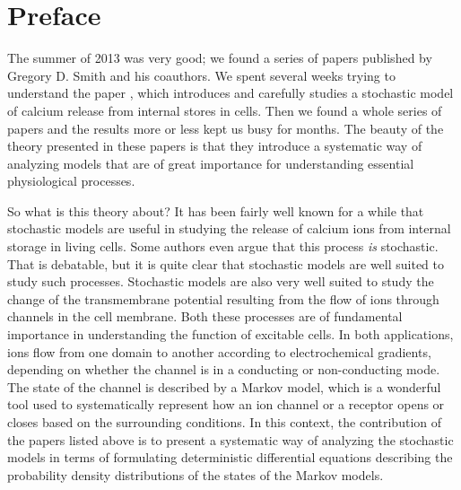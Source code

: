 

\chapter*{Preface}

The summer of 2013 was very good; we found a series of papers published by Gregory D. Smith and his coauthors. We spent several weeks trying to understand the paper \cite{Huertas2007}, which introduces and carefully studies a stochastic model of calcium release from internal stores in cells. Then we found a whole series of papers \cite{Mazzag2005,Williams2007,Williams2008,Huertas2010} and the results more or less kept us busy for months. The beauty of the theory presented in these papers is that they introduce a systematic way of analyzing models that are of great importance for understanding essential physiological processes.

\bigskip

So what is this theory about? It has been fairly well known for a while that stochastic models are useful in studying the release of calcium ions from internal storage in living cells. Some authors even argue that this process {\it is} stochastic. That is debatable, but it is quite clear that stochastic models are well suited to study such processes. Stochastic models are also very well suited to study the change of the transmembrane potential resulting from the flow of ions through channels in the cell membrane. Both these processes are of fundamental importance in understanding the function of excitable cells. In both applications, ions flow from one domain to another according to electrochemical gradients, depending on whether the channel is in a conducting or non-conducting mode. The state of the channel is described by a Markov model, which is a wonderful tool used to systematically represent how an ion channel or a receptor opens or closes based on the surrounding conditions. In this context, the contribution of the papers listed above is to present a systematic way of analyzing the stochastic models in terms of formulating deterministic differential equations describing the probability density distributions of the states of the Markov models.
\bigskip

